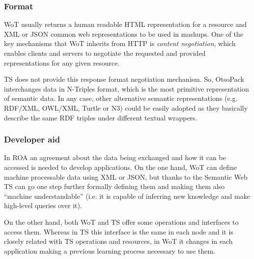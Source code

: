 \subsubsection{Format}
WoT usually returns a human readable HTML representation for a resource and XML or JSON common web representations to be used in mashups. One of the
key mechanisms that WoT inherits from HTTP is \textit{content negotiation}, which enables clients and servers to negotiate the requested and
provided representations for any given resource.

TS does not provide this response format negotiation mechanism. So, OtsoPack interchanges data in N-Triples format, which is the most primitive
representation of semantic data. In any case, other alternative semantic representations (e.g. RDF/XML, OWL/XML, Turtle or N3) could be
easily adopted as they basically describe the same RDF triples under different textual wrappers.

\subsubsection{Developer aid}%
In ROA an agreement about the data being exchanged and how it can be accessed is needed to develop applications.
On the one hand, WoT can define machine processable data using XML or JSON, but thanks to the Semantic Web TS can go one step
further formally defining them and making them also ``machine understandable'' (i.e. it is capable of inferring new knowledge and make
high-level queries over it).

On the other hand, both WoT and TS offer some operations and interfaces to access them. Whereas in TS this interface is the same in each node
and it is closely related with TS operations and resources, in WoT it changes in each application making a previous learning process necessary
to use them.


